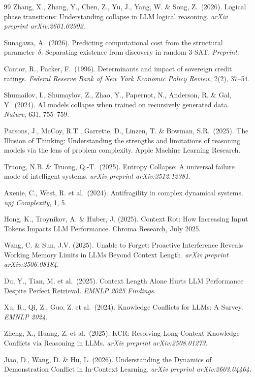 \documentclass[11pt,a4paper]{article}
\begin{document}
\begin{thebibliography}{99}
Zhang, X., Zhang, Y., Chen, Z., Yu, J., Yang, W. \& Song, Z.\ (2026).
Logical phase transitions: Understanding collapse in LLM logical reasoning.
\emph{arXiv preprint arXiv:2601.02902}.

Sunagawa, A.\ (2026).
Predicting computational cost from the structural parameter~$\delta$: Separating existence from discovery in random 3-SAT.
\emph{Preprint}.

Cantor, R., Packer, F.\ (1996).
Determinants and impact of sovereign credit ratings.
\emph{Federal Reserve Bank of New York Economic Policy Review}, 2(2), 37--54.

Shumailov, I., Shumaylov, Z., Zhao, Y., Papernot, N., Anderson, R. \& Gal, Y.\ (2024).
AI models collapse when trained on recursively generated data.
\emph{Nature}, 631, 755--759.

Parsons, J., McCoy, R.T., Garrette, D., Linzen, T. \& Bowman, S.R.\ (2025).
The Illusion of Thinking: Understanding the strengths and limitations of reasoning models via the lens of problem complexity.
Apple Machine Learning Research.

Truong, N.B. \& Truong, Q.-T.\ (2025).
Entropy Collapse: A universal failure mode of intelligent systems.
\emph{arXiv preprint arXiv:2512.12381}.

Axenie, C., West, R. et al.\ (2024).
Antifragility in complex dynamical systems.
\emph{npj Complexity}, 1, 5.

Hong, K., Troynikov, A. \& Huber, J. (2025).
Context Rot: How Increasing Input Tokens Impacts LLM Performance.
Chroma Research, July 2025.

Wang, C. \& Sun, J.V. (2025).
Unable to Forget: Proactive Interference Reveals Working Memory Limits in LLMs Beyond Context Length.
\emph{arXiv preprint arXiv:2506.08184}.

Du, Y., Tian, M. et al.\ (2025).
Context Length Alone Hurts LLM Performance Despite Perfect Retrieval.
\emph{EMNLP 2025 Findings}.

Xu, R., Qi, Z., Guo, Z. et al.\ (2024).
Knowledge Conflicts for LLMs: A Survey.
\emph{EMNLP 2024}.

Zheng, X., Huang, Z. et al.\ (2025).
KCR: Resolving Long-Context Knowledge Conflicts via Reasoning in LLMs.
\emph{arXiv preprint arXiv:2508.01273}.

Jiao, D., Wang, D. \& Hu, L. (2026).
Understanding the Dynamics of Demonstration Conflict in In-Context Learning.
\emph{arXiv preprint arXiv:2603.04464}.

\end{thebibliography}
\end{document}
